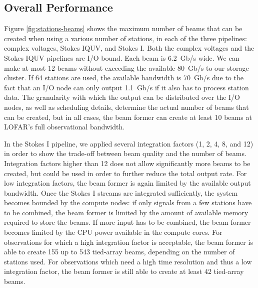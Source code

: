 \documentclass{llncs}
\begin{document}
\subsection{Overall Performance}

Figure \ref{fig:stations-beams} shows the maximum number of beams that can be created when using a various number of stations, in each of the three pipelines: complex voltages, Stokes IQUV, and Stokes I. Both the complex voltages and the Stokes IQUV pipelines are I/O bound. Each beam is 6.2~Gb/s wide. We can make at most 12 beams without exceeding the available 80~Gb/s to our storage cluster. If 64 stations are used, the available bandwidth is 70~Gb/s due to the fact that an I/O node can only output 1.1~Gb/s if it also has to process station data. The granularity with which the output can be distributed over the I/O nodes, as well as scheduling details, determine the actual number of beams that can be created, but in all cases, the beam former can create at least 10 beams at LOFAR's full observational bandwidth.

In the Stokes I pipeline, we applied several integration factors (1, 2, 4, 8, and 12) in order to show the trade-off between beam quality and the number of beams. Integration factors higher than 12 does not allow significantly more beams to be created, but could be used in order to further reduce the total output rate. For low integration factors, the beam former is again limited by the available output bandwidth. Once the Stokes I streams are integrated sufficiently, the system becomes bounded by the compute nodes: if only signals from a few stations have to be combined, the beam former is limited by the amount of available memory required to store the beams. If more input has to be combined, the beam former becomes limited by the CPU power available in the compute cores. For observations for which a high integration factor is acceptable, the beam former is able to create 155 up to 543 tied-array beams, depending on the number of stations used. For observations which need a high time resolution and thus a low integration factor, the beam former is still able to create at least 42 tied-array beams.
\end{document}
